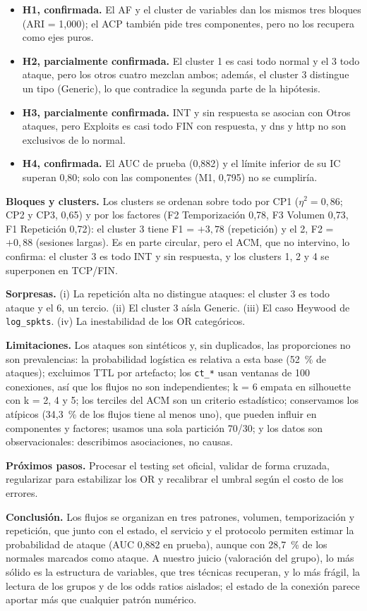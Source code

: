 \begin{itemize}\setlength{\itemsep}{0pt}\setlength{\topsep}{2pt}\setlength{\parsep}{0pt}
  \item \textbf{H1, confirmada.} El AF y el cluster de variables dan los mismos tres bloques (ARI = 1,000); el ACP también pide tres componentes, pero no los recupera como ejes puros.
  \item \textbf{H2, parcialmente confirmada.} El cluster 1 es casi todo normal y el 3 todo ataque, pero los otros cuatro mezclan ambos; además, el cluster 3 distingue un tipo (Generic), lo que contradice la segunda parte de la hipótesis.
  \item \textbf{H3, parcialmente confirmada.} INT y sin respuesta se asocian con Otros ataques, pero Exploits es casi todo FIN con respuesta, y dns y http no son exclusivos de lo normal.
  \item \textbf{H4, confirmada.} El AUC de prueba (0,882) y el límite inferior de su IC superan 0,80; solo con las componentes (M1, 0,795) no se cumpliría.
\end{itemize}

\textbf{Bloques y clusters.} Los clusters se ordenan sobre todo por CP1 ($\eta^2 = 0{,}86$; CP2 y CP3, 0,65) y por los factores (F2 Temporización 0,78, F3 Volumen 0,73, F1 Repetición 0,72): el cluster 3 tiene F1 = $+3{,}78$ (repetición) y el 2, F2 = $+0{,}88$ (sesiones largas). Es en parte circular, pero el ACM, que no intervino, lo confirma: el cluster 3 es todo INT y sin respuesta, y los clusters 1, 2 y 4 se superponen en TCP/FIN.

\textbf{Sorpresas.} (i) La repetición alta no distingue ataques: el cluster 3 es todo ataque y el 6, un tercio. (ii) El cluster 3 aísla Generic. (iii) El caso Heywood de \texttt{log\_spkts}. (iv) La inestabilidad de los OR categóricos.

\textbf{Limitaciones.} Los ataques son sintéticos y, sin duplicados, las proporciones no son prevalencias: la probabilidad logística es relativa a esta base (52~\% de ataques); excluimos TTL por artefacto; los \texttt{ct\_*} usan ventanas de 100 conexiones, así que los flujos no son independientes; k = 6 empata en silhouette con k = 2, 4 y 5; los terciles del ACM son un criterio estadístico; conservamos los atípicos (34,3~\% de los flujos tiene al menos uno), que pueden influir en componentes y factores; usamos una sola partición 70/30; y los datos son observacionales: describimos asociaciones, no causas.

\textbf{Próximos pasos.} Procesar el testing set oficial, validar de forma cruzada, regularizar para estabilizar los OR y recalibrar el umbral según el costo de los errores.

\textbf{Conclusión.} Los flujos se organizan en tres patrones, volumen, temporización y repetición, que junto con el estado, el servicio y el protocolo permiten estimar la probabilidad de ataque (AUC 0,882 en prueba), aunque con 28,7~\% de los normales marcados como ataque. A nuestro juicio (valoración del grupo), lo más sólido es la estructura de variables, que tres técnicas recuperan, y lo más frágil, la lectura de los grupos y de los odds ratios aislados; el estado de la conexión parece aportar más que cualquier patrón numérico.
